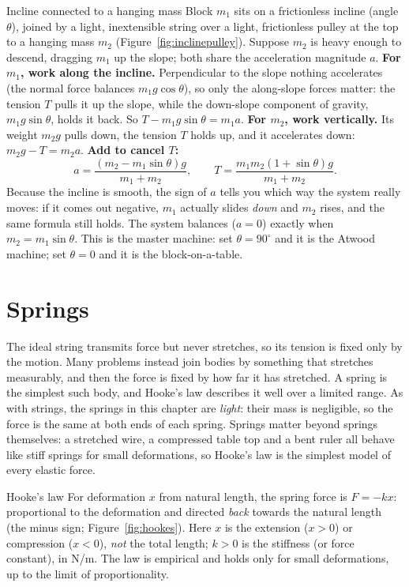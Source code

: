 \begin{derivbox}{Incline connected to a hanging mass}
Block $m_1$ sits on a frictionless incline (angle $\theta$), joined by a light, inextensible string over a light, frictionless pulley at the top
to a hanging mass $m_2$ (Figure~\ref{fig:inclinepulley}). Suppose $m_2$ is heavy enough to descend, dragging $m_1$ up the slope; both share
the acceleration magnitude $a$.
 \textbf{For $m_1$, work along the incline.} Perpendicular to the slope nothing accelerates (the
normal force balances $m_1g\cos\theta$), so only the along-slope forces matter: the tension
$T$ pulls it up the slope, while the down-slope component of gravity, $m_1g\sin\theta$, holds it back. So
$T-m_1g\sin\theta=m_1a$.
 \textbf{For $m_2$, work vertically.} Its weight $m_2g$ pulls down, the tension $T$ holds up, and
it accelerates down: $m_2g-T=m_2a$.
 \textbf{Add to cancel $T$:}
\[
a=\frac{(m_2-m_1\sin\theta)g}{m_1+m_2},\qquad T=\frac{m_1 m_2(1+\sin\theta)g}{m_1+m_2}.
\]
Because the incline is smooth, the sign of $a$ tells you which way the system really moves: if it comes
out negative, $m_1$ actually slides \emph{down} and $m_2$ rises, and the same formula still holds. The system balances ($a=0$) exactly when $m_2=m_1\sin\theta$. This is the
master machine: set $\theta=90^\circ$ and it is the Atwood machine; set $\theta=0$ and it is the
block-on-a-table.
\end{derivbox}

\section{Springs}

The ideal string transmits force but never stretches, so its tension is fixed only by the motion. Many
problems instead join bodies by something that stretches measurably, and then the force is fixed by how
far it has stretched. A spring is the simplest such body, and Hooke's law describes it well over a
limited range. As with strings, the springs in this chapter are
\emph{light}: their mass is negligible, so the force is the same at both ends of each spring. Springs
matter beyond springs themselves: a stretched wire, a compressed table top and a bent ruler all behave
like stiff springs for small deformations, so Hooke's law is the simplest model of every elastic force.

\begin{keybox}{Hooke's law}
For deformation $x$ from natural length, the spring force is $F=-kx$: proportional to the deformation and
directed \emph{back} towards the natural length (the minus sign; Figure~\ref{fig:hookes}). Here $x$ is the extension ($x>0$) or
compression ($x<0$), \emph{not} the total length; $k>0$ is the stiffness (or force constant), in
\si{N/m}. The law is empirical and holds only for small deformations, up to the limit of
proportionality.
\end{keybox}

